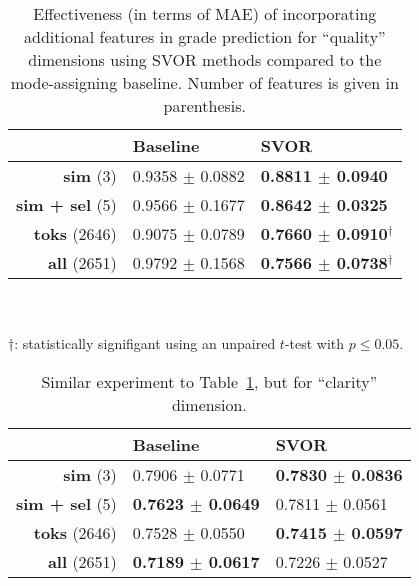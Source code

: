 \begin{table}
    \begin{tabular}{r|l|l}
        & \textbf{Baseline} & \textbf{SVOR}\\\hline

        \textbf{sim} (3)
        & 0.9358 $\pm$ 0.0882
        & \textbf{0.8811 $\pm$ 0.0940}
        \\\hline

        \textbf{sim + sel} (5)
        & 0.9566 $\pm$ 0.1677
        & \textbf{0.8642 $\pm$ 0.0325}
        \\\hline

        \textbf{toks} (2646)
        & 0.9075 $\pm$ 0.0789
        & \textbf{0.7660 $\pm$ 0.0910$^\dagger$}
        \\\hline

        \textbf{all} (2651)
        & 0.9792 $\pm$ 0.1568
        & \textbf{0.7566 $\pm$ 0.0738$^\dagger$}
        \\\hline
    \end{tabular}
    \\\\
    {\footnotesize
    $\dagger$: statistically signifigant using an unpaired $t$-test with $p
    \leq 0.05$.}

    \caption{Effectiveness (in terms of MAE) of incorporating additional
    features in grade prediction for ``quality'' dimensions using SVOR
    methods compared to the mode-assigning baseline. Number of features is
    given in parenthesis.}
    \label{table:feature-comb}
\end{table}

\begin{table}
    \begin{tabular}{r|l|l}
        & \textbf{Baseline} & \textbf{SVOR}\\\hline

        \textbf{sim} (3)
        & 0.7906 $\pm$ 0.0771
        & \textbf{0.7830 $\pm$ 0.0836}
        \\\hline

        \textbf{sim + sel} (5)
        & \textbf{0.7623 $\pm$ 0.0649}
        & 0.7811 $\pm$ 0.0561
        \\\hline

        \textbf{toks} (2646)
        & 0.7528 $\pm$ 0.0550
        & \textbf{0.7415 $\pm$ 0.0597}
        \\\hline

        \textbf{all} (2651)
        & \textbf{0.7189 $\pm$ 0.0617}
        & 0.7226 $\pm$ 0.0527
        \\\hline
    \end{tabular}

    \caption{Similar experiment to Table~\ref{table:feature-comb}, but for
    ``clarity'' dimension.}
    \label{table:feature-comb-clar}
\vskip-10pt
\end{table}
